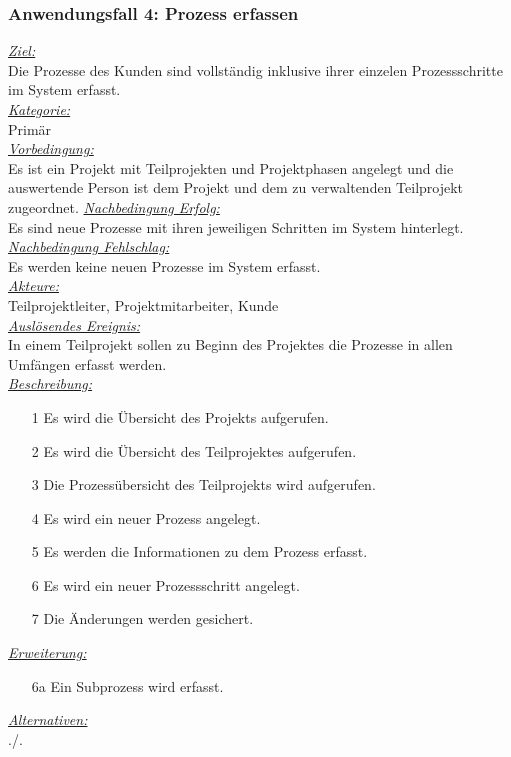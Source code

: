 \newpage
\subsubsection{Anwendungsfall 4: Prozess erfassen}
\underline{\emph{Ziel:}}\\
Die Prozesse des Kunden sind vollständig inklusive ihrer einzelen Prozessschritte im System erfasst.\\
\underline{\emph{Kategorie:}} \\
Primär\\
\underline{\emph{Vorbedingung:}} \\
Es ist ein Projekt mit Teilprojekten und Projektphasen angelegt und die auswertende Person ist dem Projekt und dem zu verwaltenden Teilprojekt zugeordnet.
\underline{\emph{Nachbedingung Erfolg:}} \\
Es sind neue Prozesse mit ihren jeweiligen Schritten im System hinterlegt.\\
\underline{\emph{Nachbedingung Fehlschlag:}} \\
Es werden keine neuen Prozesse im System erfasst.\\
\underline{\emph{Akteure:}} \\
Teilprojektleiter, Projektmitarbeiter, Kunde\\
\underline{\emph{Auslösendes Ereignis:}} \\
In einem Teilprojekt sollen zu Beginn des Projektes die Prozesse in allen Umfängen erfasst werden.\\
\underline{\emph{Beschreibung:}}
\begin{itemize}
    \item [1] Es wird die Übersicht des Projekts aufgerufen.
    \item [2] Es wird die Übersicht des Teilprojektes aufgerufen.
    \item [3] Die Prozessübersicht des Teilprojekts wird aufgerufen.
    \item [4] Es wird ein neuer Prozess angelegt.
    \item [5] Es werden die Informationen zu dem Prozess erfasst.
    \item [6] Es wird ein neuer Prozessschritt angelegt.
    \item [7] Die Änderungen werden gesichert.
\end{itemize}
\underline{\emph{Erweiterung:}}
\begin{itemize}
    \item [6a] Ein Subprozess wird erfasst.
\end{itemize}
\underline{\emph{Alternativen:}} \\
./.\\


